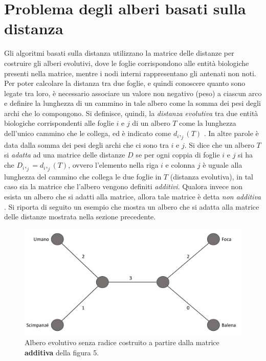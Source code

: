 \section{Problema degli alberi basati sulla distanza}
Gli algoritmi basati sulla distanza utilizzano la matrice delle distanze per costruire gli alberi evolutivi, dove le foglie corrispondono alle entità biologiche presenti nella matrice, mentre i nodi interni rappresentano gli antenati non noti. Per poter calcolare la distanza tra due foglie, e quindi conoscere quanto sono legate tra loro, è necessario associare un valore non negativo (peso) a ciascun arco e definire la lunghezza di un cammino in tale albero come la somma dei pesi degli archi che lo compongono. Si definisce, quindi, la \textit{distanza evolutiva} tra due entità biologiche corrispondenti alle foglie $i$ e $j$ di un albero $T$ come la lunghezza dell'unico cammino che le collega, ed è indicato come $d_i,_j(T)$ \cite{bioinfalganactivelearningapproachparttwo}. In altre parole è data dalla somma dei pesi degli archi che ci sono tra $i$ e $j$.
\newline
Si dice che un albero $T$ si \textit{adatta} ad una matrice delle distanze $D$ se per ogni coppia di foglie $i$ e $j$ si ha che $D_i,_j=d_i,_j(T)$, ovvero l'elemento nella riga $i$ e colonna $j$ è uguale alla lunghezza del cammino che collega le due foglie in $T$ (distanza evolutiva), in tal caso sia la matrice che l'albero vengono definiti \textit{additivi}. Qualora invece non esista un albero che si adatti alla matrice, allora tale matrice è detta \textit{non additiva} \cite{bioinfalganactivelearningapproachparttwo}.
\newline
Si riporta di seguito un esempio che mostra un albero che si adatta alla matrice delle distanze mostrata nella sezione precedente.
\begin{figure}[h!]
	\includegraphics[width=\linewidth]{unrooted_tree_created_by_figure_5.jpg}
 	\caption{Albero evolutivo senza radice costruito a partire dalla matrice \textbf{additiva} della figura 5.}
  	\label{fig:EvolutionaryTreeExample}
\end{figure}
